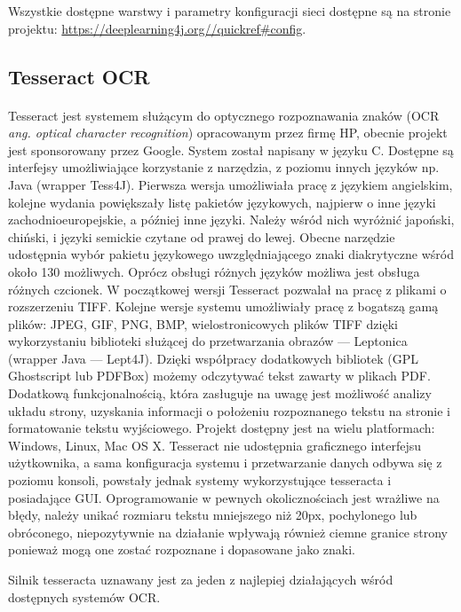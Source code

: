 \documentclass[a4paper,12pt]{article}
\begin{document}
        
        \par Wszystkie dostępne warstwy i parametry konfiguracji sieci dostępne są na stronie projektu:
        \href{https://deeplearning4j.org//quickref\#config}{\url{https://deeplearning4j.org//quickref\#config}}.
        
	\subsection{Tesseract OCR}
	    \paragraph{\indent} Tesseract jest systemem służącym do optycznego rozpoznawania znaków (OCR \textit{ang. optical character recognition}) opracowanym przez firmę HP, obecnie projekt jest sponsorowany przez Google. System został napisany w języku C. Dostępne są interfejsy umożliwiające korzystanie z narzędzia, z poziomu innych języków np. Java (wrapper Tess4J). Pierwsza wersja umożliwiała pracę z językiem angielskim, kolejne wydania powiększały listę pakietów językowych, najpierw o inne języki zachodnioeuropejskie, a później inne języki. Należy wśród nich wyróżnić japoński, chiński, i języki semickie czytane od prawej do lewej. Obecne narzędzie udostępnia wybór pakietu językowego uwzględniającego znaki diakrytyczne wśród około 130 możliwych. Oprócz obsługi różnych języków możliwa jest obsługa różnych czcionek. W początkowej wersji Tesseract pozwalał na pracę z plikami o rozszerzeniu TIFF. Kolejne wersje systemu umożliwiały pracę z bogatszą gamą plików: JPEG, GIF, PNG, BMP, wielostronicowych plików TIFF dzięki wykorzystaniu biblioteki służącej do przetwarzania obrazów --- Leptonica (wrapper Java --- Lept4J). Dzięki współpracy dodatkowych bibliotek (GPL Ghostscript lub PDFBox) możemy odczytywać tekst zawarty w plikach PDF. Dodatkową funkcjonalnością, która zasługuje na uwagę jest możliwość analizy układu strony, uzyskania informacji o położeniu rozpoznanego tekstu na stronie i formatowanie tekstu wyjściowego. Projekt dostępny jest na wielu platformach: Windows, Linux, Mac OS X. Tesseract nie udostępnia graficznego interfejsu użytkownika, a sama konfiguracja systemu i przetwarzanie danych odbywa się z poziomu konsoli, powstały jednak systemy wykorzystujące tesseracta i posiadające GUI. Oprogramowanie w pewnych okolicznościach jest wrażliwe na błędy, należy unikać rozmiaru tekstu mniejszego niż 20px, pochylonego lub obróconego, niepozytywnie na działanie wpływają również ciemne granice strony ponieważ mogą one zostać rozpoznane i dopasowane jako znaki.
	    \par Silnik tesseracta uznawany jest za jeden z najlepiej działających wśród dostępnych systemów OCR. 
\end{document}
